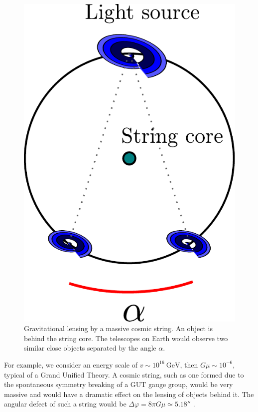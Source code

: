 \begin{figure}
	\centering
	\includegraphics[scale=0.75]{./figures/lens.pdf}
	\caption{Gravitational lensing by a massive cosmic string. An object is behind the string core. The telescopes on Earth would observe two similar close objects separated by the angle $\alpha$.}
	\label{fig:lens}
\end{figure}

For example, we consider an energy scale of $v\sim 10^{16}\ \text{GeV}$, then $G\mu\sim 10^{-6}$, typical of a Grand Unified Theory. A cosmic string, such as one formed due to the spontaneous symmetry breaking of a GUT gauge group, would be very massive and would have a dramatic effect on the lensing of objects behind it. The angular defect of such a string would be $\Delta\varphi = 8\pi G\mu \simeq 5.18''$ \cite{Vilenkin1994}.

